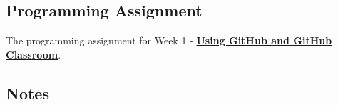\subsection{Programming Assignment}

The programming assignment for Week 1 - \href{https://github.com/cu-cspb-2270-Summer-2023/pa0-RelativiBit}{\textbf{Using GitHub and GitHub Classroom}}. \\

\subsection{Notes}